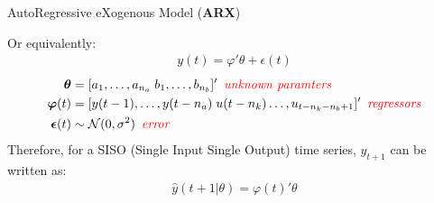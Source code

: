 \documentclass[aspectratio=169,hyperref={pdfpagelabels=false}]{beamer}
\begin{document}
  \begin{frame}{AutoRegressive eXogenous Model (\textbf{ARX})}
    \begin{block}{}
      Or equivalently:
      \vspace{0.1em}
      \begin{align*}
        \boxed{y(t) = \varphi'\theta + \epsilon(t)}
      \end{align*}
    \begin{align*}
      \bm{\theta} &= [a_1, \dots, a_{n_a} \; b_1, \dots, b_{n_b}]' \hspace{0.5em }\textit{\textcolor{red}{unknown paramters}} \\
      \bm{\varphi}(t) &= [y(t-1), \dots, y(t-n_a) \; u(t-n_k) \dots, u_{t-n_k-n_b+1}]' \hspace{0.5em }\textit{\textcolor{red}{regressors}}\\
      \bm{\epsilon}(t) &\sim \mathcal{N}(0,\sigma^2) \hspace{0.5em }\textit{\textcolor{red}{error}}
    \end{align*} \pause
    Therefore, for a SISO (Single Input Single Output) time series, $y_{t+1}$ can be written as: 
    \begin{align*}
      \boxed{\hat{y}(t+1|\theta) = \varphi(t)'\theta}
    \end{align*}  
    \end{block}
    \end{frame}
\end{document}
